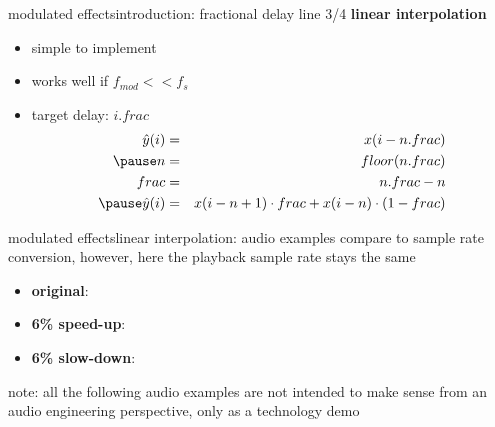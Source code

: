 		\begin{frame}{modulated effects}{introduction: fractional delay line 3/4}
			\textbf{linear interpolation}
			\begin{itemize}
				\item	simple to implement
				\item	works well if $f_{mod} << f_s$
			\pause
			\item	target delay: $i.frac$
				\begin{eqnarray*}
					\hat{y}(i) &=& x(i - n.frac)\\
					\pause
					n &=& floor(n.frac)\\
					frac &=& n.frac - n\\
					\pause
					\hat{y}(i) &=& x(i-n + 1)\cdot frac + x(i-n)\cdot (1-frac)
				\end{eqnarray*}
			\end{itemize}
		\end{frame}

		\begin{frame}{modulated effects}{linear interpolation: audio examples}
            compare to sample rate conversion, however, here the playback sample rate stays the same
            \bigskip
			\begin{itemize}
				\item   \textbf{original}: 
				\smallskip
				\item   \textbf{6\% speed-up}: 
				\smallskip
				\item   \textbf{6\% slow-down}: 
			\end{itemize}
            \bigskip
            \bigskip
            \pause
            note: all the following audio examples are not intended to make sense from an audio engineering perspective, only as a technology demo
		\end{frame}

